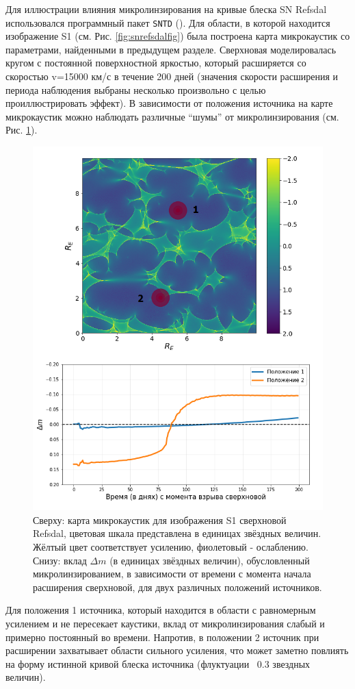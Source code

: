 Для иллюстрации влияния микролинзирования на кривые блеска SN Refsdal использовался программный пакет {\tt{SNTD}} (\cite{pierelrodney2019}). Для области, в которой находится изображение S1 (см. Рис. \ref{fig:snrefsdalfig}) была построена карта микрокаустик со параметрами, найденными в предыдущем разделе. Сверхновая моделировалась кругом с постоянной поверхностной яркостью, который расширяется со скоростью v=15000 км/с в течение 200 дней (значения скорости расширения и периода наблюдения выбраны несколько произвольно с целью проиллюстрировать эффект). В зависимости от положения источника на карте микрокаустик можно наблюдать различные “шумы” от микролинзирования (см. Рис. \ref{fig:sntd_example}).

\begin{figure}[H]
    \centering
	\includegraphics[scale=0.75]{pics/sntd_example.png}
	\caption{Сверху: карта микрокаустик для изображения S1 сверхновой Refsdal, цветовая шкала представлена в единицах звёздных величин. Жёлтый цвет соответствует усилению, фиолетовый - ослаблению. Снизу: вклад $\Delta m$ (в единицах звёздных величин), обусловленный микролинзированием, в зависимости от времени с момента начала расширения сверхновой, для двух различных положений источников. \label{fig:sntd_example}} 
\end{figure}

Для положения 1 источника, который находится в области с равномерным усилением и не пересекает каустики, вклад от микролинзирования слабый и примерно постоянный во времени. Напротив, в положении 2 источник при расширении захватывает области сильного усиления, что может заметно повлиять на форму истинной кривой блеска источника (флуктуации ~0.3 звездных величин). 